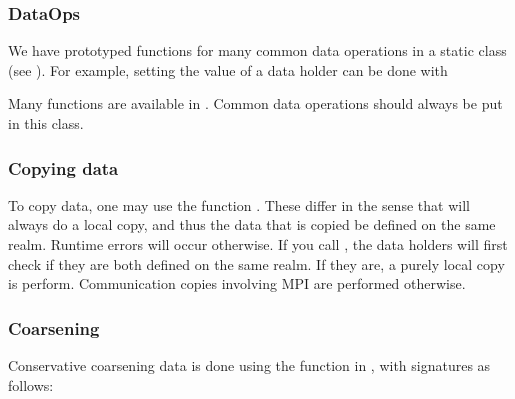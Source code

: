 \documentclass[letterpaper,10pt,english]{sphinxmanual}
\begin{document}
\subsubsection{DataOps}
\label{\detokenize{Source/MeshData:dataops}}
We have prototyped functions for many common data operations in a static class  (see ).
For example, setting the value of a data holder can be done with

\begin{sphinxVerbatim}[commandchars=\\\{\},formatcom=\scriptsize]
 
 
   

 
 
 
\end{sphinxVerbatim}

Many functions are available in .
Common data operations should always be put in this class.


\subsubsection{Copying data}
\label{\detokenize{Source/MeshData:copying-data}}
To copy data, one may use the  function  .
These differ in the sense that  will always do a local copy, and thus the data that is copied  be defined on the same realm.
Runtime errors will occur otherwise.
If you call , the data holders will first check if they are both defined on the same realm.
If they are, a purely local copy is perform.
Communication copies involving MPI are performed otherwise.


\subsubsection{Coarsening}
\label{\detokenize{Source/MeshData:coarsening}}
Conservative coarsening data is done using the  function in , with signatures as follows:
\end{document}
